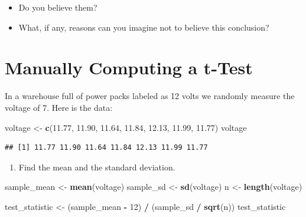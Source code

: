 \documentclass[
]{book}
\newenvironment{Shaded}{\begin{snugshade}}{\end{snugshade}}
\newcommand{\DecValTok}[1]{\textcolor[rgb]{0.00,0.00,0.81}{#1}}
\newcommand{\FloatTok}[1]{\textcolor[rgb]{0.00,0.00,0.81}{#1}}
\newcommand{\FunctionTok}[1]{\textcolor[rgb]{0.13,0.29,0.53}{\textbf{#1}}}
\newcommand{\NormalTok}[1]{#1}
\newcommand{\OtherTok}[1]{\textcolor[rgb]{0.56,0.35,0.01}{#1}}
\newcommand{\SpecialCharTok}[1]{\textcolor[rgb]{0.81,0.36,0.00}{\textbf{#1}}}
\providecommand{\tightlist}{%
  \setlength{\itemsep}{0pt}\setlength{\parskip}{0pt}}
\theoremstyle{definition}
\theoremstyle{definition}
\theoremstyle{definition}
\theoremstyle{definition}
\theoremstyle{remark}
\begin{document}
\begin{itemize}
\tightlist
\item
  Do you believe them?
\item
  What, if any, reasons can you imagine not to believe this conclusion?
\end{itemize}

\hypertarget{manually-computing-a-t-test}{%
\section{Manually Computing a t-Test}\label{manually-computing-a-t-test}}

In a warehouse full of power packs labeled as 12 volts we randomly measure the voltage of 7. Here is the data:

\begin{Shaded}
\begin{Highlighting}[]
\NormalTok{voltage }\OtherTok{\textless{}{-}} \FunctionTok{c}\NormalTok{(}\FloatTok{11.77}\NormalTok{, }\FloatTok{11.90}\NormalTok{, }\FloatTok{11.64}\NormalTok{, }\FloatTok{11.84}\NormalTok{, }\FloatTok{12.13}\NormalTok{, }\FloatTok{11.99}\NormalTok{,  }\FloatTok{11.77}\NormalTok{)}
\NormalTok{voltage}
\end{Highlighting}
\end{Shaded}

\begin{verbatim}
## [1] 11.77 11.90 11.64 11.84 12.13 11.99 11.77
\end{verbatim}

\begin{enumerate}
\def\labelenumi{\arabic{enumi}.}
\tightlist
\item
  Find the mean and the standard deviation.
\end{enumerate}

\begin{Shaded}
\begin{Highlighting}[]
\NormalTok{sample\_mean }\OtherTok{\textless{}{-}} \FunctionTok{mean}\NormalTok{(voltage)}
\NormalTok{sample\_sd   }\OtherTok{\textless{}{-}} \FunctionTok{sd}\NormalTok{(voltage)}
\NormalTok{n           }\OtherTok{\textless{}{-}} \FunctionTok{length}\NormalTok{(voltage)}

\NormalTok{test\_statistic }\OtherTok{\textless{}{-}}\NormalTok{ (sample\_mean }\SpecialCharTok{{-}} \DecValTok{12}\NormalTok{) }\SpecialCharTok{/}\NormalTok{ (sample\_sd }\SpecialCharTok{/} \FunctionTok{sqrt}\NormalTok{(n))}
\NormalTok{test\_statistic}
\end{Highlighting}
\end{Shaded}
\end{document}
